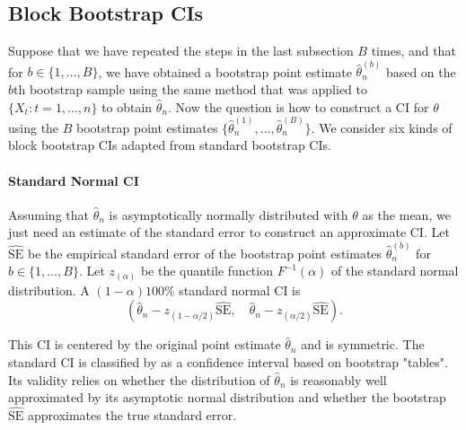 \documentclass[10pt]{article}
\newcommand{\eds}[1]{\textcolor{red}{EDS: (#1)}}
\newcommand{\mc}[1]{\textcolor{orange}{MC: (#1)}}
\begin{document}
\subsection*{Block Bootstrap CIs}

Suppose that we have repeated the steps in the last subsection $B$ times, and
that for $b \in \{1, \ldots, B\}$, we have obtained a bootstrap point estimate
$\hat\theta_n^{(b)}$ based on the $b$th bootstrap sample using the same method
that was applied to $\{X_t: t = 1, \ldots, n\}$ to obtain $\hat\theta_n$. Now
the question is how to construct a CI for $\theta$ using the $B$ bootstrap point 
estimates $\{\hat\theta_n^{(1)}, \ldots, \hat\theta_n^{(B)}\}$. We consider six 
kinds of block bootstrap CIs adapted from standard bootstrap CIs.


\paragraph{Standard Normal CI}
Assuming that $\hat\theta_n$ is asymptotically normally distributed with 
$\theta$ as the mean, we just need an estimate of the standard error to 
construct an approximate CI.\citep{efron1993introduction} Let
$\widehat{\text{SE}}$ be the empirical standard error of the bootstrap point 
estimates $\hat\theta_n^{(b)}$ for $b \in \{1, \ldots, B\}$. Let $z_{(\alpha)}$ 
be the quantile function $F^{-1}(\alpha)$ of the standard normal distribution. 
A $(1 - \alpha)100\%$ standard normal CI is
\[
(\hat{\theta}_{n} - z_{(1-\alpha/2)}\widehat{\text{SE}}, \quad
\hat{\theta}_{n} - z_{(\alpha/2)}\widehat{\text{SE}}).
\]

This CI is centered by the original point estimate $\hat\theta_n$ and is 
symmetric. The standard CI is classified by \citet{efron1993introduction} 
as a confidence interval based on bootstrap "tables". Its 
validity relies on whether the distribution of $\hat\theta_n$ is reasonably well 
approximated by its asymptotic normal distribution and whether the bootstrap
$\widehat{\text{SE}}$ approximates the true standard error.
\end{document}

